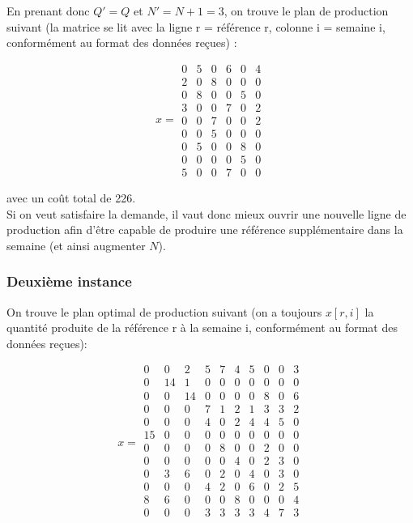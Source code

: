 \documentclass{rapport}
\begin{document}
En prenant donc $Q'=Q$ et $N'=N+1=3$, on trouve le plan de production suivant (la matrice se lit avec la ligne r = référence r, colonne i = semaine i, conformément au format des données reçues) :

\[x=
\begin{matrix}
0 & 5 & 0 & 6 & 0 & 4 \\
2 & 0 & 8 & 0 & 0 & 0 \\
0 & 8 & 0 & 0 & 5 & 0 \\
3 & 0 & 0 & 7 & 0 & 2 \\
0 & 0 & 7 & 0 & 0 & 2 \\
0 & 0 & 5 & 0 & 0 & 0 \\
0 & 5 & 0 & 0 & 8 & 0 \\
0 & 0 & 0 & 0 & 5 & 0 \\
5 & 0 & 0 & 7 & 0 & 0
\end{matrix}
\]

avec un coût total de 226. \\
Si on veut satisfaire la demande, il vaut donc mieux ouvrir une nouvelle ligne de production afin d'être capable de produire une référence supplémentaire dans la semaine (et ainsi augmenter $N$).

\subsubsection{Deuxième instance}
On trouve le plan optimal de production suivant (on a toujours $x[r,i]$ la quantité produite de la référence r à la semaine i, conformément au format des données reçues):

\[x=
\begin{matrix}
0 & 0 & 2 & 5 & 7 & 4 & 5 & 0 & 0 & 3 \\
0 & 14 & 1 & 0 & 0 & 0 & 0 & 0 & 0 & 0 \\
0 & 0 & 14 & 0 & 0 & 0 & 0 & 8 & 0 & 6 \\
0 & 0 & 0 & 7 & 1 & 2 & 1 & 3 & 3 & 2 \\
0 & 0 & 0 & 4 & 0 & 2 & 4 & 4 & 5 & 0 \\
15 & 0 & 0 & 0 & 0 & 0 & 0 & 0 & 0 & 0 \\
0 & 0 & 0 & 0 & 8 & 0 & 0 & 2 & 0 & 0 \\
0 & 0 & 0 & 0 & 0 & 4 & 0 & 2 & 3 & 0 \\
0 & 3 & 6 & 0 & 2 & 0 & 4 & 0 & 3 & 0 \\
0 & 0 & 0 & 4 & 2 & 0 & 6 & 0 & 2 & 5 \\
8 & 6 & 0 & 0 & 0 & 8 & 0 & 0 & 0 & 4 \\
0 & 0 & 0 & 3 & 3 & 3 & 3 & 4 & 7 & 3 \\
\end{matrix}
\]
\end{document}
